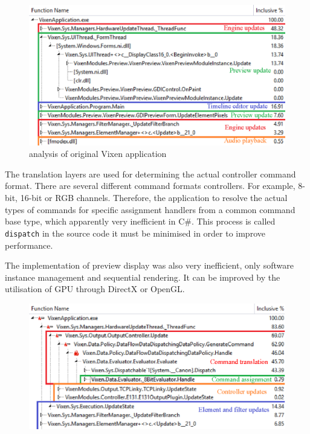 \begin{figure}[t]
  \centering
  \includegraphics[width=0.85\columnwidth]{Figs/vixen_perf_original_overview.eps}
  \caption{\footnotesize {} analysis of original Vixen application}
  \label{fig:vixen_perf_original_overview}
\end{figure}

The translation layers are used for determining the actual controller command format. There are several different command formats  controllers. For example, 8-bit, 16-bit or RGB channels. Therefore, the application  to resolve the actual types of commands for specific assignment handlers from a common command base type, which  apparently very inefficient in C\#. This process is called \texttt{dispatch} in the source code\ca{;} it must be minimised in order to improve performance.

The implementation of  preview display was also very inefficient,  only software instance management and sequential rendering. It can be improved by the utilisation of GPU through DirectX or OpenGL.


\begin{figure}[t]
  \centering
  \includegraphics[width=0.85\columnwidth]{Figs/vixen_perf_original_scheduler.eps}
  \caption{\footnotesize {}}
  \label{fig:vixen_perf_original_scheduler}
\end{figure}

